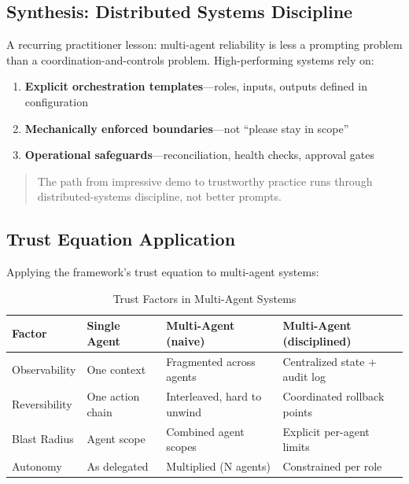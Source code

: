 \subsection{Synthesis: Distributed Systems Discipline}
\label{subsec:distributed-synthesis}

A recurring practitioner lesson: multi-agent reliability is less a prompting problem than a coordination-and-controls problem. High-performing systems rely on:

\begin{enumerate}
    \item \textbf{Explicit orchestration templates}---roles, inputs, outputs defined in configuration
    \item \textbf{Mechanically enforced boundaries}---not ``please stay in scope''
    \item \textbf{Operational safeguards}---reconciliation, health checks, approval gates
\end{enumerate}

\begin{quote}
The path from impressive demo to trustworthy practice runs through distributed-systems discipline, not better prompts.
\end{quote}

\subsection{Trust Equation Application}
\label{subsec:multi-agent-trust}

Applying the framework's trust equation to multi-agent systems:

\begin{table}[htbp]
\centering
\caption{Trust Factors in Multi-Agent Systems}
\label{tab:multi-agent-trust}
\begin{tabular}{llll}
\toprule
\textbf{Factor} & \textbf{Single Agent} & \textbf{Multi-Agent (naive)} & \textbf{Multi-Agent (disciplined)} \\
\midrule
Observability & One context & Fragmented across agents & Centralized state + audit log \\
Reversibility & One action chain & Interleaved, hard to unwind & Coordinated rollback points \\
Blast Radius & Agent scope & Combined agent scopes & Explicit per-agent limits \\
Autonomy & As delegated & Multiplied (N agents) & Constrained per role \\
\bottomrule
\end{tabular}
\end{table}

